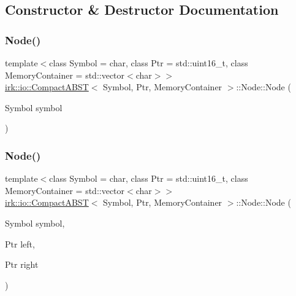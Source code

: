 \subsection{Constructor \& Destructor Documentation}
\mbox{\label{structirk_1_1io_1_1CompactABST_1_1Node_a5eec0c71885954fa52c4dcdec5ba028d}} 
\subsubsection{\texorpdfstring{Node()}{Node()}\hspace{0.1cm}{\footnotesize\ttfamily [1/2]}}
{\footnotesize\ttfamily template$<$class Symbol = char, class Ptr = std\+::uint16\+\_\+t, class Memory\+Container = std\+::vector$<$char$>$$>$ \\
\mbox{\hyperlink{classirk_1_1io_1_1CompactABST}{irk\+::io\+::\+Compact\+A\+B\+ST}}$<$ Symbol, Ptr, Memory\+Container $>$\+::Node\+::\+Node (\begin{DoxyParamCaption}\item[{Symbol}]{symbol }\end{DoxyParamCaption})\hspace{0.3cm}{\ttfamily [inline]}}

\mbox{\label{structirk_1_1io_1_1CompactABST_1_1Node_a3c77a6bfd7c39d640374c2367b678d2a}} 
\subsubsection{\texorpdfstring{Node()}{Node()}\hspace{0.1cm}{\footnotesize\ttfamily [2/2]}}
{\footnotesize\ttfamily template$<$class Symbol = char, class Ptr = std\+::uint16\+\_\+t, class Memory\+Container = std\+::vector$<$char$>$$>$ \\
\mbox{\hyperlink{classirk_1_1io_1_1CompactABST}{irk\+::io\+::\+Compact\+A\+B\+ST}}$<$ Symbol, Ptr, Memory\+Container $>$\+::Node\+::\+Node (\begin{DoxyParamCaption}\item[{Symbol}]{symbol,  }\item[{Ptr}]{left,  }\item[{Ptr}]{right }\end{DoxyParamCaption})\hspace{0.3cm}{\ttfamily [inline]}}



